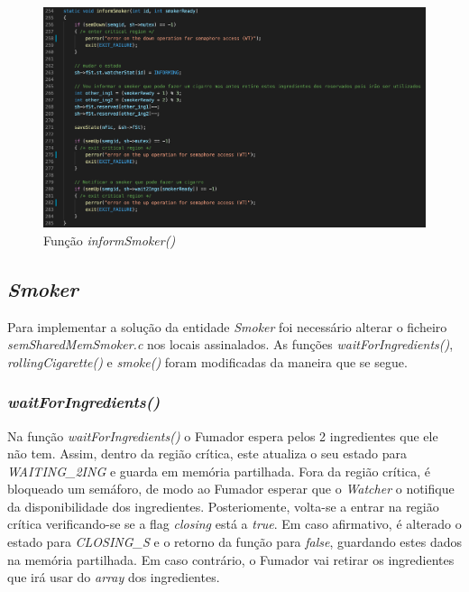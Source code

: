 \documentclass[10pt,portuguese]{article}
\begin{document}
\begin{figure}[!h]
    \centering
    \includegraphics[width=\textwidth]{images/implementation/informsmok.png}
    \caption{Função \textit{informSmoker()}}
\end{figure}

\subsection{\textit{Smoker}}
\par Para implementar a solução da entidade \textit{Smoker} foi necessário alterar o ficheiro \textit{semSharedMemSmoker.c} nos locais assinalados. As funções \textit{waitForIngredients()}, \textit{rollingCigarette()} e \textit{smoke()} foram modificadas da maneira que se segue.

\subsubsection{\textit{waitForIngredients()}}

\par Na função \textit{waitForIngredients()} o Fumador espera pelos 2 ingredientes que ele não tem. Assim, dentro da região crítica, este atualiza o seu estado para \textit{WAITING\_2ING} e guarda em memória partilhada. Fora da região crítica, é bloqueado um semáforo, de modo ao Fumador esperar que o \textit{Watcher} o notifique da disponibilidade dos ingredientes. Posteriomente, volta-se a entrar na região crítica verificando-se se a flag \textit{closing} está a \textit{true}. Em caso afirmativo, é alterado o estado para \textit{CLOSING\_S} e o retorno da função para \textit{false}, guardando estes dados na memória partilhada. Em caso contrário, o Fumador vai retirar os ingredientes que irá usar do \textit{array} dos ingredientes.
\end{document}
